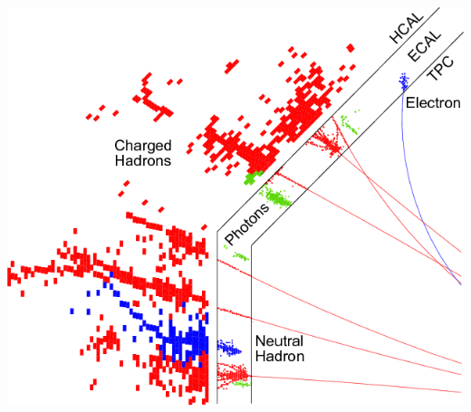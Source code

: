 \documentclass[8pt]{beamer}
\begin{document}
\begin{frame}
    \begin{minipage}{0.5\linewidth}
      \begin{center}
        \includegraphics[width=0.95\linewidth]{pfa_event_display.png}
      \end{center}
    \end{minipage}
  \end{frame}
  \endgroup
\end{document}

